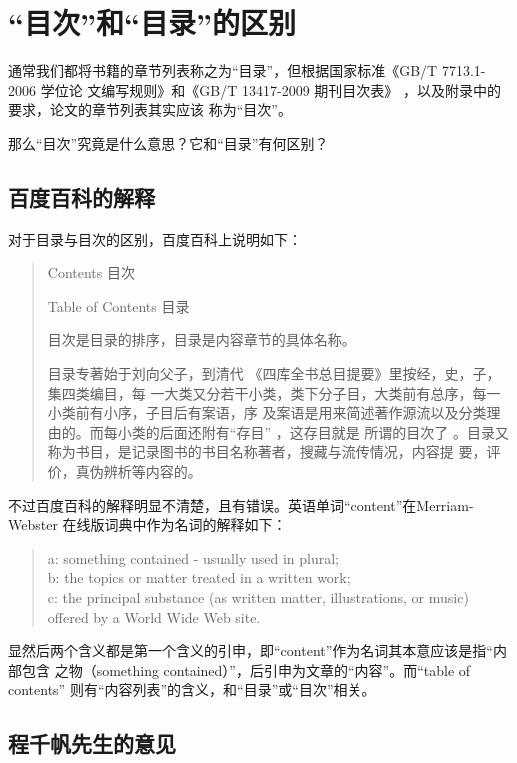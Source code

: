 \chapter{“目次”和“目录”的区别}

通常我们都将书籍的章节列表称之为“目录”，但根据国家标准《GB/T 7713.1-2006 学位论
  文编写规则》\cite{gbt7713.1-2006}和《GB/T 13417-2009 期刊目次表》
\cite{gbt13417-2009}，以及附录\cite{chap:njureq}中的要求，论文的章节列表其实应该
称为“目次”。

那么“目次”究竟是什么意思？它和“目录”有何区别？

\section{百度百科的解释}

对于目录与目次的区别，百度百科上说明如下\cite{baidu2013muci}：

\begin{quotation}
Contents 目次

Table of Contents 目录

目次是目录的排序，目录是内容章节的具体名称。

目录专著始于刘向父子，到清代 《四库全书总目提要》里按经，史，子，集四类编目，每
一大类又分若干小类，类下分子目，大类前有总序，每一小类前有小序，子目后有案语，序
及案语是用来简述著作源流以及分类理由的。而每小类的后面还附有“存目” ，这存目就是
所谓的目次了 。目录又称为书目，是记录图书的书目名称著者，搜藏与流传情况，内容提
要，评价，真伪辨析等内容的。
\end{quotation}

不过百度百科的解释明显不清楚，且有错误。英语单词``content''在Merriam-Webster
在线版词典中作为名词的解释如下：
\begin{quotation}
a: something contained - usually used in plural;\\
b: the topics or matter treated in a written work;\\
c: the principal substance (as written matter, illustrations, 
or music) offered by a World Wide Web site.
\end{quotation}

显然后两个含义都是第一个含义的引申，即``content''作为名词其本意应该是指“内部包含
之物（something contained）”，后引申为文章的“内容”。而``table of contents''
则有“内容列表”的含义，和“目录”或“目次”相关。

\section{程千帆先生的意见}

